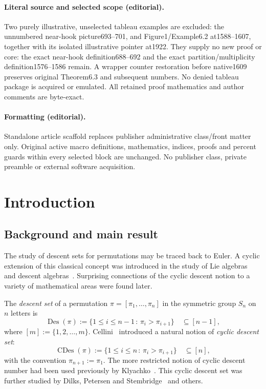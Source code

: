 \documentclass[10pt]{article}
\theoremstyle{definition}
\newcommand{\symm}{S}
\DeclareMathOperator\Des{Des}
\DeclareMathOperator\CDes{CDes}
\begin{document}
\paragraph{Literal source and selected scope (editorial).} Two purely illustrative, unselected tableau examples are excluded: the unnumbered near-hook picture693--701, and Figure1/Example6.2 at1588--1607, together with its isolated illustrative pointer at1922. They supply no new proof or core: the exact near-hook definition688--692 and the exact partition/multiplicity definition1576--1586 remain. A wrapper counter restoration before native1609 preserves original Theorem6.3 and subsequent numbers. No denied tableau package is acquired or emulated. All retained proof mathematics and author comments are byte-exact.
\paragraph{Formatting (editorial).} Standalone article scaffold replaces publisher administrative class/front matter only. Original active macro definitions, mathematics, indices, proofs and percent guards within every selected block are unchanged. No publisher class, private preamble or external software acquisition.
\clearpage
\section{Introduction}

\subsection{Background and main result}

The study of descent sets for permutations may be traced back to Euler. 
A cyclic extension of this classical concept was introduced in the study of
Lie algebras~\cite{Klyachko} and descent algebras~\cite{Cellini}. Surprising connections of the cyclic descent
notion to a variety of mathematical areas were found later.
	
The {\em descent set} of a permutation $\pi = [\pi_1, \ldots, \pi_n]$ in the symmetric group $\symm_n$ on $n$ letters is
\[
    \Des(\pi) := \{1 \le i \le n-1 \,:\, \pi_i > \pi_{i+1} \}
    \quad \subseteq [n-1],
\]
where $[m]:=\{1,2,\ldots,m\}$.  
Cellini~\cite{Cellini} introduced a natural notion of {\em cyclic descent set}: 
\[
    \CDes(\pi) := \{1 \leq i \leq n \,:\, \pi_i > \pi_{i+1} \}
    \quad \subseteq [n],
\]
with the convention $\pi_{n+1}:=\pi_1$.  
The more restricted notion of cyclic descent number had been used previously by Klyachko~\cite{Klyachko}.
This cyclic descent set was further studied by Dilks, Petersen and Stembridge~\cite{DPS} and others.
	
\end{document}
